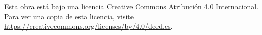 
\begin{Center}
  {\footnotesize
  Esta obra está bajo una licencia Creative Commons Atribución 4.0 Internacional. \\
  Para ver una copia de esta licencia, visite \\
  \url{https://creativecommons.org/licenses/by/4.0/deed.es}.
  \par
  }
\end{Center}


